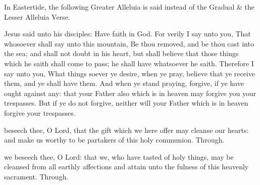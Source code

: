 
\clearpage
\begin{rubric}
    In Eastertide, the following Greater Alleluia is said instead of the Gradual \& the Lesser Alleluia Verse.
\end{rubric}


 Jesus said unto his disciples: Have faith in God. For verily I say unto you, That whosoever shall say unto this mountain, Be thou removed, and be thou cast into the sea; and shall not doubt in his heart, but shall believe that those things which he saith shall come to pass; he shall have whatsoever he saith. Therefore I say unto you, What things soever ye desire, when ye pray, believe that ye receive them, and ye shall have them. And when ye stand praying, forgive, if ye have ought against any: that your Father also which is in heaven may forgive you your trespasses. But if ye do not forgive, neither will your Father which is in heaven forgive your trespasses.


\secret
{} beseech thee, O Lord, that the gift which we here offer may cleanse our hearts: and make us worthy to be partakers of this holy communion. Through.


\postcommunion
{} we beseech thee, O Lord: that we, who have tasted of holy things, may be cleansed from all earthly affections and attain unto the fulness of this heavenly sacrament. Through.


